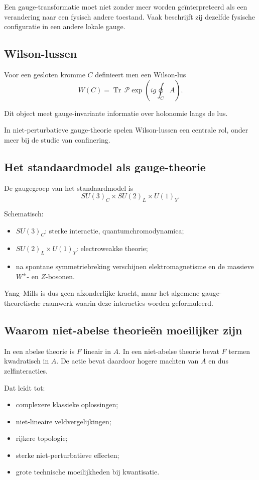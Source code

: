 \documentclass[11pt,a4paper]{article}
\newcommand{\Tr}{\operatorname{Tr}}
\begin{document}
\begin{waarschuwing}
Een gauge-transformatie moet niet zonder meer worden geïnterpreteerd als een verandering naar een fysisch andere toestand. Vaak beschrijft zij dezelfde fysische configuratie in een andere lokale gauge.
\end{waarschuwing}

\subsection{Wilson-lussen}

Voor een gesloten kromme $C$ definieert men een Wilson-lus
\[
W(C)=\Tr\,\mathcal{P}\exp\left(i g\oint_C A\right).
\]

Dit object meet gauge-invariante informatie over holonomie langs de lus.

In niet-perturbatieve gauge-theorie spelen Wilson-lussen een centrale rol, onder meer bij de studie van confinering.

\subsection{Het standaardmodel als gauge-theorie}

De gaugegroep van het standaardmodel is
\[
SU(3)_C\times SU(2)_L\times U(1)_Y.
\]

Schematisch:
\begin{itemize}
    \item $SU(3)_C$: sterke interactie, quantumchromodynamica;
    \item $SU(2)_L\times U(1)_Y$: electroweakke theorie;
    \item na spontane symmetriebreking verschijnen elektromagnetisme en de massieve $W^\pm$- en $Z$-bosonen.
\end{itemize}

Yang--Mills is dus geen afzonderlijke kracht, maar het algemene gauge-theoretische raamwerk waarin deze interacties worden geformuleerd.

\subsection{Waarom niet-abelse theorieën moeilijker zijn}

In een abelse theorie is $F$ lineair in $A$. In een niet-abelse theorie bevat $F$ termen kwadratisch in $A$. De actie bevat daardoor hogere machten van $A$ en dus zelfinteracties.

Dat leidt tot:
\begin{itemize}
    \item complexere klassieke oplossingen;
    \item niet-lineaire veldvergelijkingen;
    \item rijkere topologie;
    \item sterke niet-perturbatieve effecten;
    \item grote technische moeilijkheden bij kwantisatie.
\end{itemize}
\end{document}
